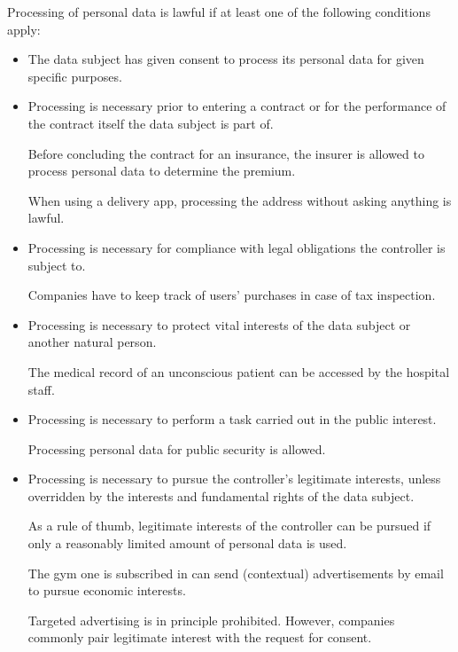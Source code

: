 Processing of personal data is lawful if at least one of the following conditions apply:
\begin{itemize}
    \item The data subject has given consent to process its personal data for given specific purposes.
    
    \item Processing is necessary prior to entering a contract or for the performance of the contract itself the data subject is part of.
    \begin{example}
        Before concluding the contract for an insurance, the insurer is allowed to process personal data to determine the premium.
    \end{example}
    \begin{example}
        When using a delivery app, processing the address without asking anything is lawful.
    \end{example}

    \item Processing is necessary for compliance with legal obligations the controller is subject to.
    \begin{example}
        Companies have to keep track of users' purchases in case of tax inspection.
    \end{example}

    \item Processing is necessary to protect vital interests of the data subject or another natural person.
    \begin{example}
        The medical record of an unconscious patient can be accessed by the hospital staff.
    \end{example}

    \item Processing is necessary to perform a task carried out in the public interest.
    \begin{example}
        Processing personal data for public security is allowed.
    \end{example}

    \item Processing is necessary to pursue the controller's legitimate interests, unless overridden by the interests and fundamental rights of the data subject.
    \begin{remark}
        As a rule of thumb, legitimate interests of the controller can be pursued if only a reasonably limited amount of personal data is used.
    \end{remark}
    \begin{example}
        The gym one is subscribed in can send (contextual) advertisements by email to pursue economic interests.
    \end{example}
    \begin{example}
        Targeted advertising is in principle prohibited. However, companies commonly pair legitimate interest with the request for consent.
    \end{example}
\end{itemize}



